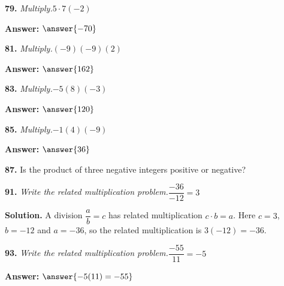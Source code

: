 \documentclass{ximera}
\begin{document}
\begin{problem}
\textbf{79.} \emph{Multiply.}\quad $5 \cdot 7(-2)$

\textbf{Answer:} $\answer{-70}$
\end{problem}

\begin{problem}
\textbf{81.} \emph{Multiply.}\quad $(-9)(-9)(2)$

\textbf{Answer:} $\answer{162}$
\end{problem}

\begin{problem}
\textbf{83.} \emph{Multiply.}\quad $-5(8)(-3)$

\textbf{Answer:} $\answer{120}$
\end{problem}

\begin{problem}
\textbf{85.} \emph{Multiply.}\quad $-1(4)(-9)$

\textbf{Answer:} $\answer{36}$
\end{problem}

\begin{problem}
\textbf{87.} Is the product of three negative integers positive or negative?

\begin{multipleChoice}
\end{multipleChoice}
\end{problem}

\begin{problem}
\textbf{91.} \emph{Write the related multiplication problem.}\quad $\dfrac{-36}{-12} = 3$

\begin{multipleChoice}
\end{multipleChoice}

\begin{hint}
\textbf{Solution.} A division $\dfrac{a}{b}=c$ has related multiplication $c\cdot b=a$. Here $c=3$, $b=-12$ and $a=-36$, so the related multiplication is $3(-12)=-36$.
\end{hint}
\end{problem}

\begin{problem}
\textbf{93.} \emph{Write the related multiplication problem.}\quad $\dfrac{-55}{11} = -5$

\textbf{Answer:} $\answer{-5(11)=-55}$
\end{problem}
\end{document}
